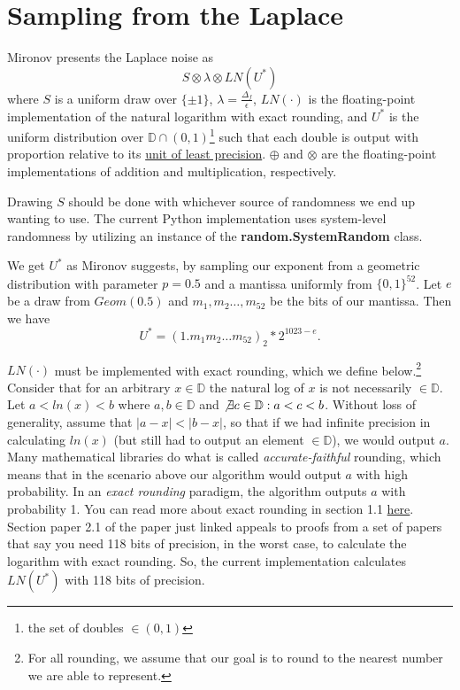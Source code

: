 \documentclass[11pt]{scrartcl} %
\begin{document}
\section{Sampling from the Laplace}
Mironov presents the Laplace noise as
\[ S \otimes \lambda \otimes LN(U^*) \]
where $S$ is a uniform draw over $\{\pm 1\}$, $\lambda = \frac{\Delta_f}{\epsilon}$, $LN(\cdot)$ is the floating-point implementation of the natural logarithm with exact rounding, and $U^*$ is the uniform distribution over $\mathbb{D} \cap (0,1)$\footnote{the set of doubles $\in (0,1)$} such that each double is output with proportion relative to its \href{https://en.wikipedia.org/wiki/Unit_in_the_last_place}{unit of least precision}. $\oplus$ and $\otimes$ are the floating-point implementations of addition and multiplication, respectively. \newline

Drawing $S$ should be done with whichever source of randomness we end up wanting to use. The current Python implementation uses system-level randomness by utilizing an instance of the \textbf{random.SystemRandom} class. \newline

We get $U^*$ as Mironov suggests, by sampling our exponent from a geometric distribution with parameter $p = 0.5$ and a mantissa uniformly from $\{0,1\}^{52}$. Let $e$ be a draw from $Geom(0.5)$ and $m_1, m_2 \hdots, m_{52}$ be the bits of our mantissa. Then we have
\[ U^{*} = (1.m_1m_2 \hdots m_{52})_2 * 2^{1023 - e}. \]

$LN(\cdot)$ must be implemented with exact rounding, which we define below.\footnote{For all rounding, we assume that our goal is to round to the nearest number we are able to represent.} Consider that for an arbitrary $x \in \mathbb{D}$ the natural log of $x$ is not necessarily $\in \mathbb{D}$. Let $a < ln(x) < b$ where $a,b \in \mathbb{D}$ and $\not\exists c \in \mathbb{D}: a < c < b$. Without loss of generality, assume that $\vert a-x \vert < \vert b - x \vert$, so that if we had infinite precision in calculating $ln(x)$ (but still had to output an element $\in \mathbb{D}$), we would output $a$. Many mathematical libraries do what is called \textit{accurate-faithful} rounding, which means that in the scenario above our algorithm would output $a$ with high probability. In an \textit{exact rounding} paradigm, the algorithm outputs $a$ with probability 1. You can read more about exact rounding in section 1.1 \href{http://www.ens-lyon.fr/LIP/Pub/Rapports/RR/RR2005/RR2005-37.pdf}{here}. Section paper 2.1 of the paper just linked appeals to proofs from a set of papers that say you need 118 bits of precision, in the worst case, to calculate the logarithm with exact rounding. So, the current implementation calculates $LN(U^*)$ with 118 bits of precision. \newline
\end{document}
